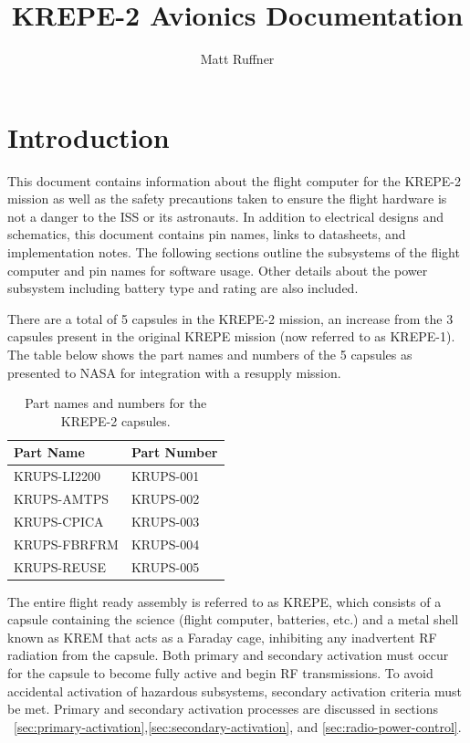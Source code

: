 \documentclass{article}
\title{KREPE-2 Avionics Documentation}
\author{Matt Ruffner}
\date{}
\begin{document}
\maketitle
\tableofcontents
\listoffigures
\listoftables
\newpage


\section{Introduction}

This document contains information about the flight computer for the KREPE-2 mission as well as the safety precautions taken to ensure the flight hardware is not a danger to the ISS or its astronauts. In addition to electrical designs and schematics, this document contains pin names, links to datasheets, and implementation notes. The following sections outline the subsystems of the flight computer and pin names for software usage. Other details about the power subsystem including battery type and rating are also included. 

There are a total of 5 capsules in the KREPE-2 mission, an increase from the 3 capsules present in the original KREPE mission (now referred to as KREPE-1). The table below shows the part names and numbers of the 5 capsules as presented to NASA for integration with a resupply mission.

\begin{table}[H]
\centering
\caption{Part names and numbers for the KREPE-2 capsules.}
\label{tab:partnames}
\begin{tabular}{l | l}
Part Name & Part Number \\
\hline
KRUPS-LI2200 & KRUPS-001 \\
KRUPS-AMTPS & KRUPS-002 \\
KRUPS-CPICA & KRUPS-003 \\
KRUPS-FBRFRM & KRUPS-004 \\
KRUPS-REUSE & KRUPS-005 
\end{tabular}
\end{table}

The entire flight ready assembly is referred to as KREPE, which consists of a capsule containing the science (flight computer, batteries, etc.) and a metal shell known as KREM that acts as a Faraday cage, inhibiting any inadvertent RF radiation from the capsule. Both primary and secondary activation must occur for the capsule to become fully active and begin RF transmissions. To avoid accidental activation of hazardous subsystems, secondary activation criteria must be met. Primary and secondary activation processes are discussed in sections ~\ref{sec:primary-activation},\ref{sec:secondary-activation}, and \ref{sec:radio-power-control}.
\end{document}
